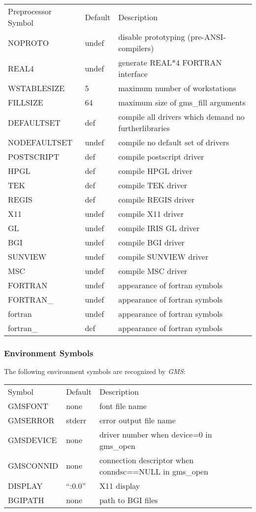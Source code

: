 \begin{center}
\begin{tabular}{lll}\hline
Preprocessor Symbol& Default& Description\\ 
NOPROTO &  undef & disable prototyping (pre-ANSI-compilers)\\ 
REAL4 &  undef & generate REAL*4 FORTRAN interface\\ 
WSTABLESIZE &  5 & maximum number of workstations\\ 
FILLSIZE &  64 & maximum size of gms\_fill arguments\\ 
DEFAULTSET &  def & compile all drivers which demand no furtherlibraries\\ 
NODEFAULTSET &  undef & compile no default set of drivers\\ 
POSTSCRIPT &  def & compile postscript driver\\ 
HPGL &  def & compile HPGL driver\\ 
TEK &  def & compile TEK driver\\ 
REGIS &  def & compile REGIS driver\\ 
X11 &  undef & compile X11 driver\\ 
GL &  undef & compile IRIS GL driver\\ 
BGI &  undef & compile BGI driver\\ 
SUNVIEW &  undef & compile SUNVIEW driver\\ 
MSC &  undef & compile MSC driver\\ 
FORTRAN &  undef & appearance of fortran symbols\\ 
FORTRAN\_ &  undef & appearance of fortran symbols\\ 
fortran &  undef & appearance of fortran symbols\\ 
fortran\_ &  def & appearance of fortran symbols\\ 
\hline\end{tabular}
\end{center}



\newpage



\subsubsection{Environment Symbols\label{Env}}The following environment symbols are recognized by {\em GMS\/}:
\begin{center}
\begin{tabular}{lll}\hline
Symbol & Default& Description\\ 
GMSFONT & none & font file name\\ 
GMSERROR & stderr& error output file name\\ 
GMSDEVICE& none & driver number when device=0 in gms\_open\\ 
GMSCONNID& none & connection descriptor when conndsc==NULL in gms\_open\\ 
DISPLAY & ``:0.0''& X11 display\\ 
BGIPATH & none & path to BGI files\\ 
\hline\end{tabular}
\end{center}



